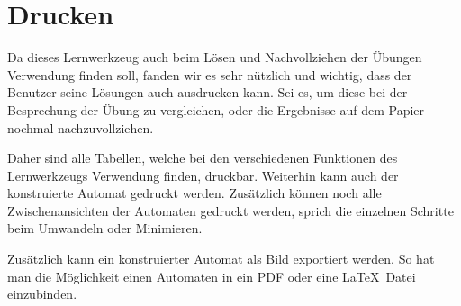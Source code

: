 

\chapter{Drucken}\label{Print}

Da dieses Lernwerkzeug auch beim Lösen und Nachvollziehen der Übungen
Verwendung finden soll, fanden wir es sehr nützlich und wichtig, dass der
Benutzer seine Lösungen auch ausdrucken kann. Sei es, um diese bei der
Besprechung der Übung zu vergleichen, oder die Ergebnisse auf dem Papier
nochmal nachzuvollziehen.\vspace{10pt}

Daher sind alle Tabellen, welche bei den verschiedenen Funktionen des
Lernwerkzeugs Verwendung finden, druckbar. Weiterhin kann auch der konstruierte
Automat gedruckt werden. Zusätzlich können noch alle Zwischenansichten der
Automaten gedruckt werden, sprich die einzelnen Schritte beim Umwandeln oder
Minimieren.\vspace{10pt}

Zusätzlich kann ein konstruierter Automat als Bild exportiert werden. So hat man
die Möglichkeit einen Automaten in ein PDF oder eine \LaTeX \ Datei
einzubinden.\vspace{10pt}
